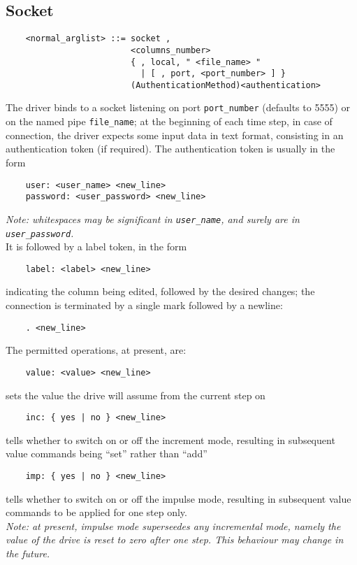 \subsection{Socket}
\begin{verbatim}
    <normal_arglist> ::= socket , 
                         <columns_number>
                         { , local, " <file_name> " 
                           | [ , port, <port_number> ] }
                         (AuthenticationMethod)<authentication>
\end{verbatim}
The driver binds to a socket listening on port \texttt{port\_number} 
(defaults to 5555) or on the named pipe \texttt{file\_name}; at the
beginning of each time step, in case of connection, the driver expects some
input data in text format, consisting in an authentication token 
(if required).
The authentication token is usually in the form
\begin{verbatim}
    user: <user_name> <new_line>
    password: <user_password> <new_line>
\end{verbatim}
{\em 
    Note: whitespaces may be significant in \texttt{user\_name}, and surely are
    in \texttt{user\_password}.
} \\    
It is followed by a label token, in the form
\begin{verbatim}
    label: <label> <new_line>
\end{verbatim}
indicating the column being edited, followed by the desired changes; 
the connection is terminated by a single mark followed by a newline:
\begin{verbatim}
    . <new_line>
\end{verbatim}
The permitted operations, at present, are:
\begin{verbatim}
    value: <value> <new_line>
\end{verbatim}
sets the value the drive will assume from the current step on
\begin{verbatim}
    inc: { yes | no } <new_line>
\end{verbatim}
tells whether to switch on or off the increment mode, resulting in
subsequent value commands being ``set'' rather than ``add''
\begin{verbatim}
    imp: { yes | no } <new_line>
\end{verbatim}
tells whether to switch on or off the impulse mode, resulting in subsequent
value commands to be applied for one step only. \\
{\em 
    Note: at present, impulse mode superseedes any incremental mode, namely
    the value of the drive is reset to zero after one step.
    This behaviour may change in the future.
}

